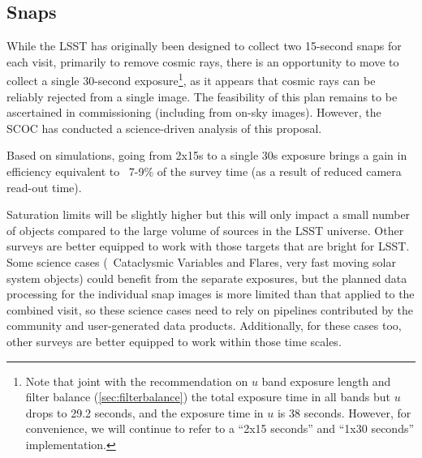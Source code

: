 \subsection{Snaps}\label{sec:snaps}

While the LSST has originally been designed to collect two 15-second snaps for each visit, primarily to remove cosmic rays, there is an opportunity to move to collect a single 30-second exposure\footnote{Note that joint with the recommendation on $u$ band exposure length and filter balance (\autoref{sec:filterbalance}) the total exposure time in all bands but $u$ drops to 29.2 seconds, and the exposure time in $u$ is 38 seconds. However, for convenience, we will continue to refer to a ``2x15 seconds'' and ``1x30 seconds'' implementation.}, as it appears that cosmic rays can be reliably rejected from a single image. The feasibility of this plan remains to be ascertained in commissioning (including from on-sky images). However, the SCOC has conducted a science-driven analysis of this proposal. 

Based on simulations, going from 2x15s to a single 30s exposure brings a gain in efficiency equivalent to ~7-9\% of the survey time (as a result of reduced camera read-out time). 


Saturation limits will be slightly higher but this will only impact a small number of objects compared to the large volume of sources in the LSST universe. Other surveys are better equipped to work with those targets that are bright for LSST.
Some science cases (\eg\ Cataclysmic Variables and Flares, very fast moving solar system objects) could benefit from the separate exposures, but the planned data processing for the individual snap images is more limited than that applied to the combined visit, so these science cases need to rely on pipelines contributed by the community and user-generated data products. Additionally, for these cases too, other surveys are better equipped to work within those time scales.

